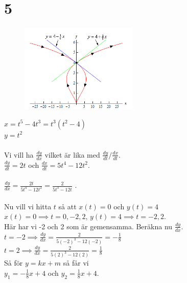 \documentclass{article}
\begin{document}
\section*{5}
\begin{figure}
\centering
\includegraphics[width=0.5\textwidth]{curvesol}
\end{figure}
$x = t^5 - 4t^3 = t^3 (t^2-4)$   \\
$y = t^2$ \\ \\ 
Vi vill ha $\frac{dy}{dx}$ vilket är lika med $\frac{dy}{dt} \Big/  \frac{dx}{dt} $. \\
$\frac{dy}{dt} = 2t$ och $\frac{dx}{dt} = 5t^4 - 12t^2$. \\ \\ 
$\frac{dy}{dx} = \frac{2t}{5t^4 - 12t^2} = \frac{2}{5t^3 - 12t}$ . \\ \\ 
Nu vill vi hitta $t$ så att $x(t) = 0$ och $y(t) = 4$  \\
$x(t) = 0 \implies t = 0, -2, 2$, \quad
$y(t) = 4 \implies t = -2, 2$. \\
Här har vi -2 och 2 som är gemensamma. Beräkna nu $\frac{dy}{dx}$. \\
$t = -2 \implies \frac{dy}{dx} = \frac{2}{5(-2)^3 - 12(-2)} = -\frac{1}{8}$ \\
$t =  2 \implies \frac{dy}{dx} = \frac{2}{5(2)^3  - 12(2)}  = \frac{1}{8}$ \\
Så för $y = kx + m$ så får vi \\ 
$y_1 = -\frac{1}{8}x + 4$ och $y_2 = \frac{1}{8}x + 4$. 
\end{document}
